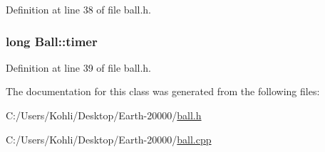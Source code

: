 Definition at line 38 of file ball.h.\hypertarget{class_ball_a51083e10e55e81e79491670c42525bfa}{
\subsubsection[{timer}]{\setlength{\rightskip}{0pt plus 5cm}long {\bf Ball::timer}}}
\label{class_ball_a51083e10e55e81e79491670c42525bfa}


Definition at line 39 of file ball.h.

The documentation for this class was generated from the following files:\begin{DoxyCompactItemize}
\item 
C:/Users/Kohli/Desktop/Earth-\/20000/\hyperlink{ball_8h}{ball.h}\item 
C:/Users/Kohli/Desktop/Earth-\/20000/\hyperlink{ball_8cpp}{ball.cpp}\end{DoxyCompactItemize}
